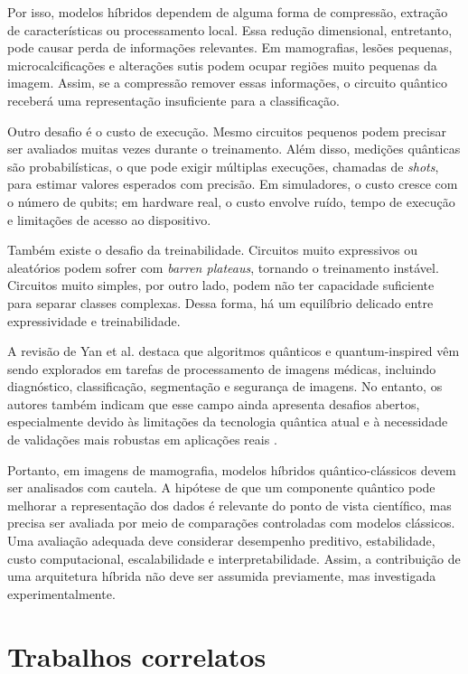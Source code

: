 \documentclass[
    12pt,
    openright,
    oneside,
    a4paper,
    english,
    brazil
]{abntex2}
\begin{document}
Por isso, modelos híbridos dependem de alguma forma de compressão, extração de características ou processamento local. Essa redução dimensional, entretanto, pode causar perda de informações relevantes. Em mamografias, lesões pequenas, microcalcificações e alterações sutis podem ocupar regiões muito pequenas da imagem. Assim, se a compressão remover essas informações, o circuito quântico receberá uma representação insuficiente para a classificação.

Outro desafio é o custo de execução. Mesmo circuitos pequenos podem precisar ser avaliados muitas vezes durante o treinamento. Além disso, medições quânticas são probabilísticas, o que pode exigir múltiplas execuções, chamadas de \textit{shots}, para estimar valores esperados com precisão. Em simuladores, o custo cresce com o número de qubits; em hardware real, o custo envolve ruído, tempo de execução e limitações de acesso ao dispositivo.

Também existe o desafio da treinabilidade. Circuitos muito expressivos ou aleatórios podem sofrer com \textit{barren plateaus}, tornando o treinamento instável. Circuitos muito simples, por outro lado, podem não ter capacidade suficiente para separar classes complexas. Dessa forma, há um equilíbrio delicado entre expressividade e treinabilidade.

A revisão de Yan et al. destaca que algoritmos quânticos e quantum-inspired vêm sendo explorados em tarefas de processamento de imagens médicas, incluindo diagnóstico, classificação, segmentação e segurança de imagens. No entanto, os autores também indicam que esse campo ainda apresenta desafios abertos, especialmente devido às limitações da tecnologia quântica atual e à necessidade de validações mais robustas em aplicações reais \cite{yan2024quantumMedicalImageReview}.

Portanto, em imagens de mamografia, modelos híbridos quântico-clássicos devem ser analisados com cautela. A hipótese de que um componente quântico pode melhorar a representação dos dados é relevante do ponto de vista científico, mas precisa ser avaliada por meio de comparações controladas com modelos clássicos. Uma avaliação adequada deve considerar desempenho preditivo, estabilidade, custo computacional, escalabilidade e interpretabilidade. Assim, a contribuição de uma arquitetura híbrida não deve ser assumida previamente, mas investigada experimentalmente.

\section{Trabalhos correlatos}
\end{document}
